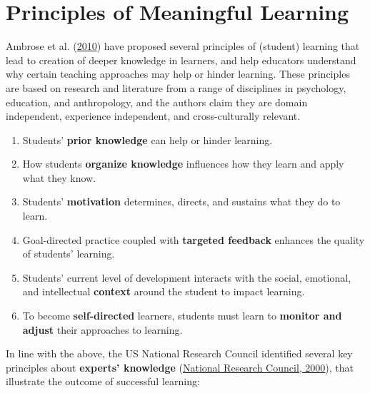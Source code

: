 \documentclass[letterpaper, nobind]{templates/ociamthesis}
\providecommand{\tightlist}{%
  \setlength{\itemsep}{0pt}\setlength{\parskip}{0pt}}
\begin{document}
\hypertarget{sec-bg-learn-principles}{%
\section{Principles of Meaningful Learning}\label{sec-bg-learn-principles}}

Ambrose et al. (\protect\hyperlink{ref-ambrose2010howa}{2010}) have proposed several principles of (student)
learning that lead to creation of deeper knowledge in learners, and help
educators understand why certain teaching approaches may help or hinder
learning. These principles are based on research and literature from a
range of disciplines in psychology, education, and anthropology, and the
authors claim they are domain independent, experience independent, and
cross-culturally relevant.

\begin{enumerate}
\def\labelenumi{\arabic{enumi}.}
\tightlist
\item
  Students' \textbf{prior knowledge} can help or hinder learning.
\item
  How students \textbf{organize knowledge} influences how they learn and apply what they know.
\item
  Students' \textbf{motivation} determines, directs, and sustains what they do to learn.
\item
  Goal-directed practice coupled with \textbf{targeted feedback} enhances the quality of students' learning.
\item
  Students' current level of development interacts with the social, emotional, and intellectual \textbf{context} around the student to impact learning.
\item
  To become \textbf{self-directed} learners, students must learn to \textbf{monitor and adjust} their approaches to learning.
\end{enumerate}

In line with the above, the US National Research Council identified
several key principles about \textbf{experts' knowledge} (\protect\hyperlink{ref-council2000how}{National Research Council, 2000}),
that illustrate the outcome of successful learning:
\end{document}
